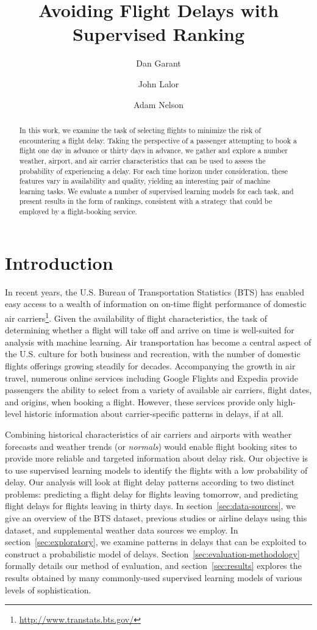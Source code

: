\documentclass[twocolumn]{article}
\title{Avoiding Flight Delays with Supervised Ranking}
\author{Dan Garant \and John Lalor \and Adam Nelson}
\date{}
\begin{document}
\maketitle

\begin{abstract}
In this work, we examine the task of selecting flights to minimize the risk of encountering a flight delay.
Taking the perspective of a passenger attempting to book a flight one day in advance or thirty days in advance, we gather and explore a number weather, airport, and air carrier characteristics that can be used to assess the probability of experiencing a delay.
For each time horizon under consideration, these features vary in availability and quality, yielding an interesting pair of machine learning tasks.
We evaluate a number of supervised learning models for each task, and present results in the form of rankings, consistent with a strategy that could be employed by a flight-booking service.
\end{abstract}

\section{Introduction}

In recent years, the U.S. Bureau of Transportation Statistics (BTS)  has enabled easy access to a wealth of information on on-time flight performance of domestic air carriers\footnote{\url{http://www.transtats.bts.gov/}}.
Given the availability of flight characteristics, the task of determining whether a flight will take off and arrive on time is well-suited for analysis with machine learning.
Air transportation has become a central aspect of the U.S. culture for both business and recreation, with the number of domestic flights offerings growing steadily for decades.
Accompanying the growth in air travel, numerous online services including Google Flights and Expedia provide passengers the ability to select from a variety of available air carriers, flight dates, and origins, when booking a flight.
However, these services provide only high-level historic information about carrier-specific patterns in delays, if at all.

Combining historical characteristics of air carriers and airports with weather forecasts and weather trends (or \emph{normals}) would enable flight booking sites to provide more reliable and targeted information about delay risk.
Our objective is to use supervised learning models to identify the flights with a low probability of delay. Our analysis will look at flight delay patterns according to two distinct problems: predicting a flight delay for flights leaving tomorrow, and predicting flight delays for flights leaving in thirty days.
In section~\ref{sec:data-sources}, we give an overview of the BTS dataset, previous studies or airline delays using this dataset, and supplemental weather data sources we employ.
In section~\ref{sec:exploratory}, we examine patterns in delays that can be exploited to construct a probabilistic model of delays.
Section~\ref{sec:evaluation-methodology} formally details our method of evaluation, and section~\ref{sec:results} explores the results obtained by many commonly-used supervised learning models of various levels of sophistication.
\end{document}
